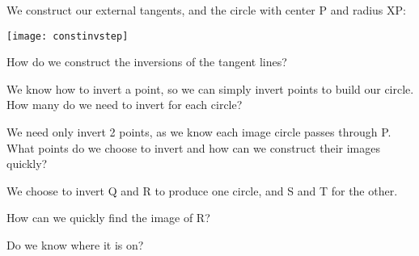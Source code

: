 

We construct our external tangents, and the circle with center P and radius XP:

\begin{center}
    \texttt{[image: constinvstep]}    
\end{center}
How do we construct the inversions of the tangent lines?


We know how to invert a point, so we can simply invert points to build our circle.  How many do we need to invert for each circle?



We need only invert 2 points, as we know each image circle passes through P.  What points do we choose to invert and how can we construct their images quickly?



We choose to invert Q and R to produce one circle, and S and T for the other.

How can we quickly find the image of R?

Do we know where it is on?


